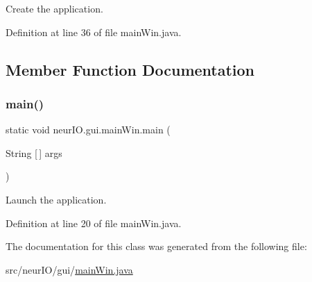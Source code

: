Create the application. 

Definition at line 36 of file main\+Win.\+java.



\subsection{Member Function Documentation}
\mbox{\label{classneur_i_o_1_1gui_1_1main_win_a83d7ab4e35ec91fe149719b2c25cf834}} 
\subsubsection{\texorpdfstring{main()}{main()}}
{\footnotesize\ttfamily static void neur\+I\+O.\+gui.\+main\+Win.\+main (\begin{DoxyParamCaption}\item[{String \mbox{[}$\,$\mbox{]}}]{args }\end{DoxyParamCaption})\hspace{0.3cm}{\ttfamily [static]}}

Launch the application. 

Definition at line 20 of file main\+Win.\+java.



The documentation for this class was generated from the following file\+:\begin{DoxyCompactItemize}
\item 
src/neur\+I\+O/gui/\hyperlink{neur_i_o_2gui_2main_win_8java}{main\+Win.\+java}\end{DoxyCompactItemize}
